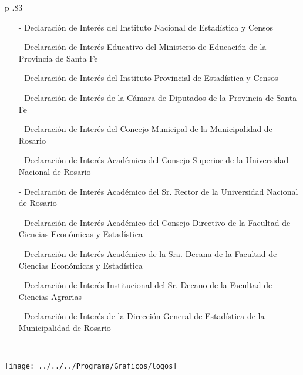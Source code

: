 \documentclass[12pt,a4paper]{article}
\renewcommand{\headrulewidth}{0.4pt}
\renewcommand{\footrulewidth}{0.4pt}
\newcommand{\Footer}{17 al 20 de octubre 2017. Rosario, Argentina}
\newcommand{\SetHeader}[2]{
	\fancyhead{}
	\fancyhead[LE,RO]{\textit{#1}}
	\fancyhead[RE,LO]{ #2}
	\fancyfoot{}
	\fancyfoot[LE,RO]{\thepage}
	\fancyfoot[RE,LO]{\small{\Footer}}
	\renewcommand{\headrulewidth}{0.4pt}
	\renewcommand{\footrulewidth}{0.4pt}
}
\begin{document}
\begin{longtable}{ p {.83\textwidth}}  

\begin{itemize}
\item[-] Declaración de Interés del Instituto Nacional de Estadística y Censos
\item[-] Declaración de Interés Educativo del Ministerio de Educación de la Provincia de Santa Fe
\item[-] Declaración de Interés del Instituto Provincial de Estadística y Censos
\item[-] Declaración de Interés de la Cámara de Diputados de la Provincia de Santa Fe
\item[-] Declaración de Interés del Concejo Municipal de la Municipalidad de Rosario
\item[-] Declaración de Interés Académico del Consejo Superior de la Universidad Nacional de Rosario
\item[-] Declaración de Interés Académico del Sr. Rector de la Universidad Nacional de Rosario
\item[-] Declaración de Interés Académico del Consejo Directivo de la Facultad de Ciencias Económicas y Estadística
\item[-] Declaración de Interés Académico de la Sra. Decana de la Facultad de Ciencias Económicas y Estadística
\item[-] Declaración de Interés Institucional del Sr. Decano de la Facultad de Ciencias Agrarias
\item[-] Declaración de Interés de la Dirección General de Estadística de la Municipalidad de Rosario
\end{itemize}\\
\end{longtable}

%
%



\newpage
\noindent
\thispagestyle{empty}

\vspace*{1cm}
\begin{center} \setlength{\unitlength}{1cm}
	\noindent
  \texttt{[image: ../../../Programa/Graficos/logos]}
\end{center}
\end{document}
